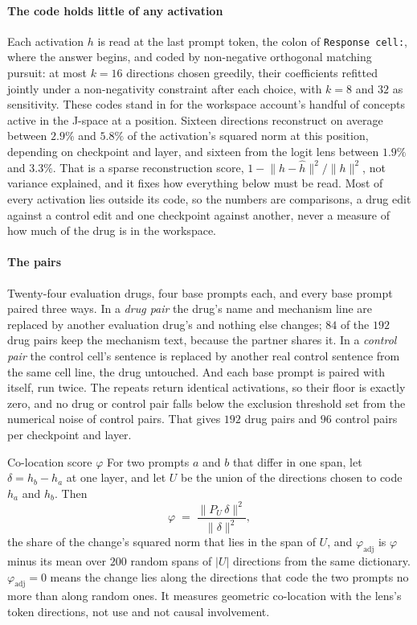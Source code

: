 \paragraph{The code holds little of any activation} Each activation $h$ is read
at the last prompt token, the colon of \texttt{Response cell:}, where the answer
begins, and coded by non-negative orthogonal matching pursuit: at most $k = 16$
directions chosen greedily, their coefficients refitted jointly under a
non-negativity constraint after each choice, with $k = 8$ and $32$ as
sensitivity. These codes stand in for the workspace account's handful of
concepts active in the J-space at a position. Sixteen directions reconstruct on average between $2.9\%$ and
$5.8\%$ of the activation's squared norm at this position, depending on
checkpoint and layer, and sixteen from the logit lens between $1.9\%$ and
$3.3\%$. That is a sparse reconstruction score,
$1 - \lVert h - \hat{h} \rVert^{2} / \lVert h \rVert^{2}$, not variance
explained, and it fixes how everything below must be read. Most of every
activation lies outside its code, so the numbers are comparisons, a drug edit
against a control edit and one checkpoint against another, never a measure of
how much of the drug is in the workspace.

\paragraph{The pairs} Twenty-four evaluation drugs, four base prompts each, and
every base prompt paired three ways. In a \emph{drug pair} the drug's name and
mechanism line are replaced by another evaluation drug's and nothing else
changes; $84$ of the $192$ drug pairs keep the mechanism text, because the
partner shares it. In a \emph{control pair} the control cell's sentence is
replaced by another real control sentence from the same cell line, the drug
untouched. And each base prompt is paired with itself, run twice. The repeats
return identical activations, so their floor is exactly zero, and no drug or
control pair falls below the exclusion threshold set from the numerical noise of
control pairs. That gives $192$ drug pairs and $96$ control pairs per checkpoint
and layer.

\begin{defn}{Co-location score $\varphi$}
For two prompts $a$ and $b$ that differ in one span, let
$\delta = h_b - h_a$ at one layer, and let $U$ be the union of the directions
chosen to code $h_a$ and $h_b$. Then
\[
  \varphi \;=\; \frac{\lVert P_U\, \delta \rVert^{2}}{\lVert \delta \rVert^{2}},
\]
the share of the change's squared norm that lies in the span of $U$, and
$\varphi_{\textrm{adj}}$ is $\varphi$ minus its mean over $200$ random spans of
$|U|$ directions from the same dictionary. $\varphi_{\textrm{adj}} = 0$ means
the change lies along the directions that code the two prompts no more than
along random ones. It measures geometric co-location with the lens's token
directions, not use and not causal involvement.
\end{defn}

